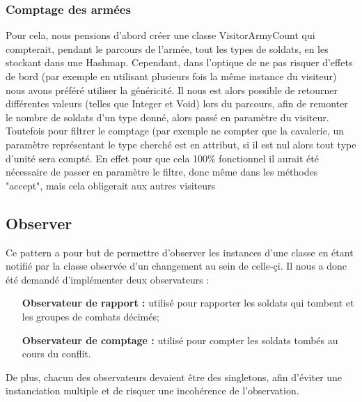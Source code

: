 \documentclass[12pt]{article}
\begin{document}
\subsubsection{Comptage des armées}
Pour cela, nous pensions d'abord créer une classe VisitorArmyCount qui compterait, 
pendant le parcours de l'armée, tout les types de soldats, en les stockant dans 
une Hashmap. Cependant, dans l'optique de ne pas risquer d'effets de bord (par 
exemple en utilisant plusieurs fois la même instance du visiteur) nous avons 
préféré utiliser la généricité. Il nous est alors possible de retourner 
différentes valeurs (telles que Integer et Void) lors du parcours, afin de 
remonter le nombre de soldats d'un type donné, alors passé en paramètre du 
visiteur. Toutefois pour filtrer le comptage (par exemple ne compter que la 
cavalerie, un paramètre représentant le type cherché est en attribut, si il est 
nul alors tout type d'unité sera compté. En effet pour que cela 100\% 
fonctionnel il aurait été nécessaire de passer en paramètre le filtre, donc même
dans les méthodes "accept", mais cela obligerait aux autres visiteurs
\subsection{Observer}
Ce pattern a pour but de permettre d'observer les instances d'une classe en étant notifié par la classe observée d'un changement au sein de celle-çi. Il nous a donc été demandé d'implémenter deux observateurs :
\begin{enumerate}
\item[\textbf{Observateur de rapport :}] utilisé pour rapporter les soldats qui tombent et les groupes de combats décimés; 
\item[\textbf{Observateur de comptage :}] utilisé pour compter les soldats tombés au cours du conflit. 
\end{enumerate}
De plus, chacun des observateurs devaient être des singletons, afin d'éviter une instanciation multiple et de risquer une incohérence de l'observation.
\end{document}
